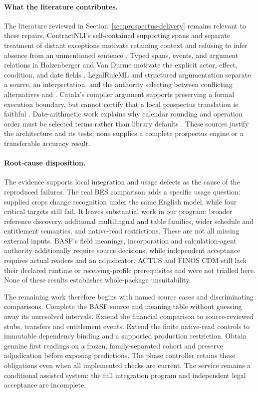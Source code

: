 \paragraph{What the literature contributes.}
The literature reviewed in Section~\ref{sec:prospectus-delivery} remains relevant
to these repairs.  ContractNLI's self-contained supporting spans and
separate treatment of distant exceptions motivate retaining context and refusing
to infer absence from an unmentioned sentence \cite[Sections 2--5 and
Appendix A.1]{contractnli2021}.  Typed spans, events, and argument relations in
Holzenberger and Van Durme motivate the explicit actor, effect, condition, and
date fields \cite[Sections 3--5 and Appendices B, D and E]{connecting2023}.
LegalRuleML and structured argumentation separate a source, an interpretation,
and the authority selecting between conflicting alternatives
\cite[Sections 3--4]{legalinterpretations2014} and
\cite[Sections 3 and 6]{aspic2010}.
Catala's compiler argument supports preserving a formal execution boundary, but
cannot certify that a local prospectus translation is faithful
\cite[Sections 4.1, 4.4--4.5 and 6.1]{catala2021}.  Date-arithmetic work explains
why calendar rounding and operation order must be selected terms rather than
library defaults \cite[Sections 2, 3.2 and 4.3]{dates2024}.  These sources justify
the architecture and its tests; none supplies a complete prospectus engine or
a transferable accuracy result.

\paragraph{Root-cause disposition.}
The evidence supports local integration and usage defects as the cause of the
reproduced failures.  The real BES comparison adds a specific usage question:
supplied crops change recognition under the same English model, while four
critical targets still fail.  It leaves substantial work in our program: broader
reference discovery, additional multilingual and table families, wider schedule and
entitlement semantics, and native-read restrictions.  These are not all missing
external inputs.  BASF's field meanings, incorporation and calculation-agent
authority additionally require source decisions, while independent acceptance
requires actual readers and an adjudicator.  ACTUS and FINOS CDM still lack their
declared runtime or receiving-profile prerequisites and were not trialled here.
None of these results establishes whole-package unsuitability.

The remaining work therefore begins with named source cases and discriminating
comparisons.  Complete the BASF source and meaning table without guessing away
its unresolved intervals.  Extend the financial comparison to source-reviewed
stubs, transfers and entitlement events.  Extend the finite native-read controls
to immutable dependency binding and a supported production restriction.  Obtain genuine first
readings on a frozen, family-separated cohort and preserve adjudication before
exposing predictions.  The phase controller retains these obligations even
when all implemented checks are current.  The service remains a conditional
assisted system; the full integration program and independent legal acceptance
are incomplete.
